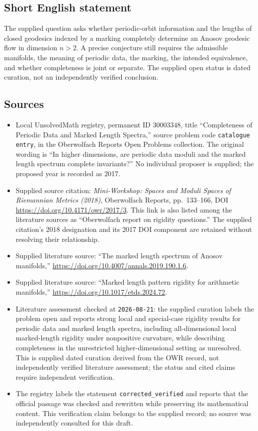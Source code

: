\documentclass[11pt]{article}
\begin{document}
\subsection{Short English statement}
The supplied question asks whether periodic-orbit information and the lengths of closed geodesics indexed by a marking completely determine an Anosov geodesic flow in dimension \(n>2\). A precise conjecture still requires the admissible manifolds, the meaning of periodic data, the marking, the intended equivalence, and whether completeness is joint or separate. The supplied open status is dated curation, not an independently verified conclusion.
\subsection{Sources}
\begin{itemize}
\item Local UnsolvedMath registry, permanent ID \(30003348\), title ``Completeness of Periodic Data and Marked Length Spectra,'' source problem code \texttt{catalogue entry}, in the Oberwolfach Reports Open Problems collection. The original wording is ``In higher dimensions, are periodic data moduli and the marked length spectrum complete invariants?'' No individual proposer is supplied; the proposed year is recorded as 2017.
\item Supplied source citation: \emph{Mini-Workshop: Spaces and Moduli Spaces of Riemannian Metrics (2018)}, Oberwolfach Reports, pp.\ 133--166, DOI \url{https://doi.org/10.4171/owr/2017/3}. This link is also listed among the literature sources as ``Oberwolfach report on rigidity questions.'' The supplied citation's 2018 designation and its 2017 DOI component are retained without resolving their relationship.
\item Supplied literature source: ``The marked length spectrum of Anosov manifolds,'' \url{https://doi.org/10.4007/annals.2019.190.1.6}.
\item Supplied literature source: ``Marked length pattern rigidity for arithmetic manifolds,'' \url{https://doi.org/10.1017/etds.2024.72}.
\item Literature assessment checked at \texttt{2026-08-21}: the supplied curation labels the problem open and reports strong local and special-case rigidity results for periodic data and marked length spectra, including all-dimensional local marked-length rigidity under nonpositive curvature, while describing completeness in the unrestricted higher-dimensional setting as unresolved. This is supplied dated curation derived from the OWR record, not independently verified literature assessment; the status and cited claims require independent verification.
\item The registry labels the statement \texttt{corrected\_verified} and reports that the official passage was checked and rewritten while preserving its mathematical content. This verification claim belongs to the supplied record; no source was independently consulted for this draft.
\end{itemize}
\end{document}

